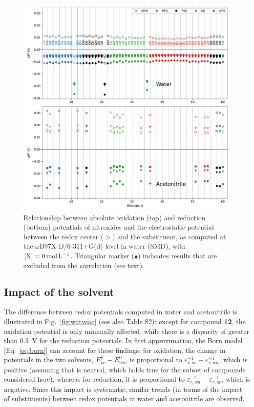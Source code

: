\documentclass[review]{elsarticle}
\begin{document}
\begin{figure}[!h]
\centering
\includegraphics[width=\linewidth]{Figure8}
\caption{Relationship between absolute oxidation (top) and reduction (bottom) potentials of nitroxides and the electrostatic potential between the redox center ($>$) and the substituent, as computed at the $\omega$B97X-D/6-311+G(d) level in water (SMD), with $[\ce{X}]=\SI{0}{\mole\per\liter}$. Triangular marker ($\blacktriangle$) indicates results that are excluded from the correlation (see text).}
\label{fig:corr} 
\end{figure}

\clearpage

\subsection{Impact of the solvent} \label{sec:solv}

The difference between redox potentials computed in water and acetonitrile is illustrated in Fig.~\ref{fig:watvsac} (see also Table S2): except for compound \textbf{12}, the oxidation potential is only minimally affected, while there is a disparity of greater than \SI{0.5}{\volt} for the reduction potentials. In first approximation, the Born model [Eq.~\eqref{eq:born}] can account for these findings: for oxidation, the change in potentials in the two solvents, $E^0_{ac} - E^0_{wa}$, is proportional to $\varepsilon_{r,ac}^{-1}-\varepsilon_{r,wa}^{-1}$, which is positive (assuming that  is neutral, which holds true for the subset of compounds considered here), whereas for reduction, it is proportional to $\varepsilon_{r,wa}^{-1}-\varepsilon_{r,ac}^{-1}$, which is negative. Since this impact is systematic, similar trends (in terms of the impact of substituents) between redox potentials in water and acetonitrile are observed.
\end{document}
